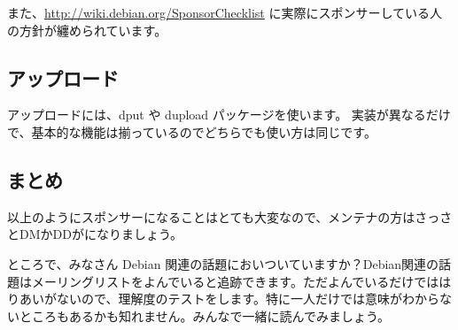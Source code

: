 \documentclass[mingoth,a4paper]{jsarticle}
\begin{document}
また、\url{http://wiki.debian.org/SponsorChecklist}
に実際にスポンサーしている人の方針が纏められています。

\subsection{アップロード}
アップロードには、dput や dupload パッケージを使います。
実装が異なるだけで、基本的な機能は揃っているのでどちらでも使い方は同じです。

\subsection{まとめ}
以上のようにスポンサーになることはとても大変なので、メンテナの方はさっさとDMかDDがになりましょう。



\clearpage



ところで、みなさん Debian 関連の話題においついていますか？Debian関連の話
題はメーリングリストをよんでいると追跡できます。ただよんでいるだけではは
りあいがないので、理解度のテストをします。特に一人だけでは意味がわからな
いところもあるかも知れません。みんなで一緒に読んでみましょう。


\begin{multicols}{2}
 
\end{multicols}

\clearpage
{}
\end{document}
